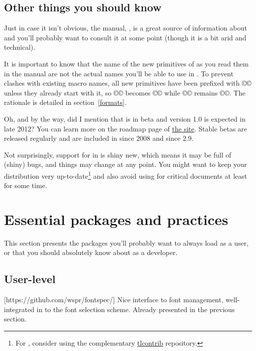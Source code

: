 \documentclass{lltxdoc}
\begin{document}
\subsection{Other things you should know}\label{things}

Just in case it isn't obvious, the \luatex manual, , is
a great source of information about \luatex and you'll probably want to
consult it at some point (though it is a bit arid and technical).

It is important to know that the name of the new primitives of \luatex as you
read them in the manual are not the actual names you'll be able to use in
\lualatex. To prevent clashes with existing macro names, all new primitives
have been prefixed with ©\luatex© unless they already start with it, so
©\luaescapestring© becomes ©\luatexluaescapetring© while ©\luatexversion©
remains ©\luatexversion©. The rationale is detailed in section~\ref{formats}.

\medskip

Oh, and by the way, did I mention that \luatex is in beta and version 1.0 is
expected in late 2012? You can learn more on the roadmap page of
\href{http://luatex.org/}{the \luatex site}. Stable betas are released
regularly and are included in \texlive since 2008 and \miktex since 2.9.

Not surprisingly, support for \luatex in \latex is shiny new, which means it
may be full of (shiny) bugs, and things may change at any point. You might
want to keep your \tex distribution very up-to-date\footnote{For \texlive,
  consider using the complementary
  \href{http://tlcontrib.metatex.org/} {tlcontrib} repository.} and also avoid
using \lualatex for critical documents at least for some time.


\section{Essential packages and practices}\label{essential}

This section presents the packages you'll probably want to always load as a
user, or that you should absolutely know about as a developer.

\subsection{User-level}

[https://github.com/wspr/fontspec/]
Nice interface to font management, well-integrated in to the \latex font
selection scheme. Already presented in the previous section.
\end{document}
